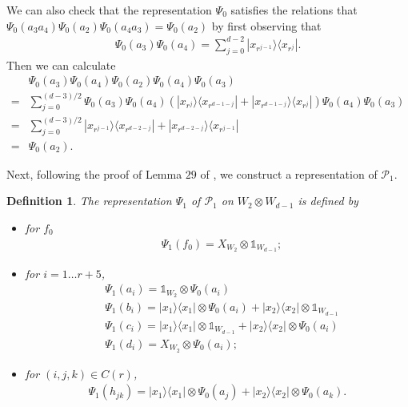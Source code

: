 \documentclass[11pt,letterpaper]{article}
\newcommand{\ketbra}[2]{|#1\rangle\langle#2|}
\newcommand{\x}{\otimes}
\newcommand{\1}{\mathbb{1}}
\newcommand{\Pg}{\mathcal{P}}
\newtheorem{definition}[theorem]{Definition}
\theoremstyle{definition}
\begin{document}
We can also check that the representation $\Psi_0$ satisfies the relations
that $\Psi_0(a_3a_4) \Psi_0(a_2) \Psi_0(a_4a_3) = \Psi_0(a_2)$ by first observing that
	\begin{align*}
		\Psi_0(a_3)\Psi_0(a_4)= \sum_{j=0}^{d-2} \ketbra{x_{r^{j-1}}}{x_{r^j}}.
	\end{align*}
Then we can calculate  
	\begin{align*}
		&\Psi_0(a_3)\Psi_0(a_4) \Psi_0(a_2) \Psi_0(a_4) \Psi_0(a_3)\\
		= &\sum_{j=0}^{(d-3)/2} \Psi_0(a_3)\Psi_0(a_4) (\ketbra{x_{r^j}}{x_{r^{d-1-j}}}+\ketbra{x_{r^{d-1-j}}}{x_{r^j}}) \Psi_0(a_4)\Psi_0(a_3)\\
		=& \sum_{j=0}^{(d-3)/2} \ketbra{x_{r^{j-1}}}{x_{r^{d-2-j}}}+\ketbra{x_{r^{d-2-j}}}{x_{r^{j-1}}}\\ 
		=& \Psi_0(a_2).
	\end{align*}

Next, following the proof of Lemma $29$ of \cite{slofstra2017}, we construct a representation of $\Pg_1$.
\begin{definition}
\label{def:rep_g1}
The representation $\Psi_1$ of $\Pg_1$ on $W_2 \x W_{d-1}$ is defined by
\begin{itemize}
\item for $f_0$
\begin{align*}
	&\Psi_1(f_0) = X_{W_2} \x \1_{W_{d-1}};
\end{align*}
\item
for $i = 1 \dots r+5$,
\begin{align*}
	&\Psi_1(a_i) = \1_{W_2} \x \Psi_0(a_i) \\
	&\Psi_1(b_i) = \ketbra{x_1}{x_1} \x \Psi_0(a_i) + \ketbra{x_2}{x_2} \x \1_{W_{d-1}} \\
	&\Psi_1(c_i) =\ketbra{x_1}{x_1} \x \1_{W_{d-1}} + \ketbra{x_2}{x_2} \x \Psi_0(a_i) \\
	&\Psi_1(d_i) =  X_{W_2} \x \Psi_0(a_i);
\end{align*}
\item for $(i,j,k) \in C(r)$,
\begin{align*}
	\Psi_1(h_{jk}) = \ketbra{x_1}{x_1} \x \Psi_0(a_j) + \ketbra{x_2}{x_2} \x \Psi_0(a_k).
\end{align*}
\end{itemize}
\end{definition}
\end{document}
